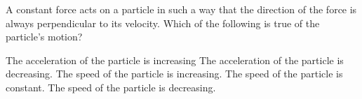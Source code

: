 \documentclass{../../../oss-apphys-exam}
\begin{document}
\begin{questions}
%    
%    
   
  \question A constant force acts on a particle in such a way that the
  direction of the force is always perpendicular to its velocity. Which of the
  following is true of the particle's motion?
  \begin{choices}
    \choice The acceleration of the particle is increasing
    \choice The acceleration of the particle is decreasing.
    \choice The speed of the particle is increasing.
    \choice The speed of the particle is constant.
    \choice The speed of the particle is decreasing.
  \end{choices}


\end{questions}
\end{document}
